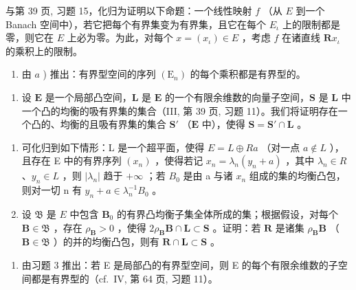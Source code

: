 与第 39 页, 习题 15，化归为证明以下命题：一个线性映射 \(f\) （从 \(E\) 到一个 Banach 空间中），若它把每个有界集变为有界集，且它在每个 \(E_{\iota}\) 上的限制都是零，则它在 \(E\) 上必为零。为此，对每个 \(x = (x_{\iota}) \in E\) ，考虑 \(f\) 在诸直线 \(\mathbf{R}x_{\iota}\) 的乘积上的限制。

\begin{enumerate}
\def\labelenumi{\alph{enumi})}
\setcounter{enumi}{1}
\tightlist
\item
  由 \(a\) ) 推出：有界型空间的序列 \((\mathrm{E}_n)\) 的每个乘积都是有界型的。
\end{enumerate}

\begin{enumerate}
\def\labelenumi{\arabic{enumi})}
\setcounter{enumi}{2}
\tightlist
\item
  设 \(\mathbf{E}\) 是一个局部凸空间，\(\mathbf{L}\) 是 \(\mathbf{E}\) 的一个有限余维数的向量子空间，\(\mathbf{S}\) 是 \(\mathbf{L}\) 中一个凸的均衡的吸有界集的集合（III, 第 39 页, 习题 11）。我们将证明存在一个凸的、均衡的且吸有界集的集合 \(\mathbf{S}'\) （\(\mathbf{E}\) 中），使得 \(\mathbf{S} = \mathbf{S}' \cap \mathbf{L}\) 。
\end{enumerate}

\begin{enumerate}
\def\labelenumi{\alph{enumi})}
\item
  可化归到如下情形：L 是一个超平面，使得 \(E = L \oplus Ra\) （对一点 \(a \notin L\) ），且存在 E 中的有界序列 \((x_{n})\) ，使得若记 \(x_{n} = \lambda_{n}(y_{n} + a)\) ，其中 \(\lambda_{n} \in R\) 、\(y_{n} \in L\) ，则 \(|\lambda_{n}|\) 趋于 \(+\infty\) ；若 \(B_{0}\) 是由 a 与诸 \(x_{n}\) 组成的集的均衡凸包，则对一切 n 有 \(y_{n} + a \in \lambda_{n}^{-1}B_{0}\) 。
\item
  设 \(\mathfrak{B}\) 是 \(E\) 中包含 \(\mathbf{B}_0\) 的有界凸均衡子集全体所成的集；根据假设，对每个 \(\mathbf{B} \in \mathfrak{B}\) ，存在 \(\rho_{\mathbf{B}} > 0\) ，使得 \(2\rho_{\mathbf{B}}\mathbf{B} \cap \mathbf{L} \subset \mathbf{S}\) 。证明：若 \(\mathbf{R}\) 是诸集 \(\rho_{\mathbf{B}}\mathbf{B}\) （\(\mathbf{B} \in \mathfrak{B}\) ）的并的均衡凸包，则有 \(\mathbf{R} \cap \mathbf{L} \subset \mathbf{S}\) 。
\end{enumerate}

\begin{enumerate}
\def\labelenumi{\arabic{enumi})}
\setcounter{enumi}{3}
\tightlist
\item
  由习题 3 推出：若 E 是局部凸的有界型空间，则 E 的每个有限余维数的子空间都是有界型的（cf.~IV, 第 64 页, 习题 11）。
\end{enumerate}

